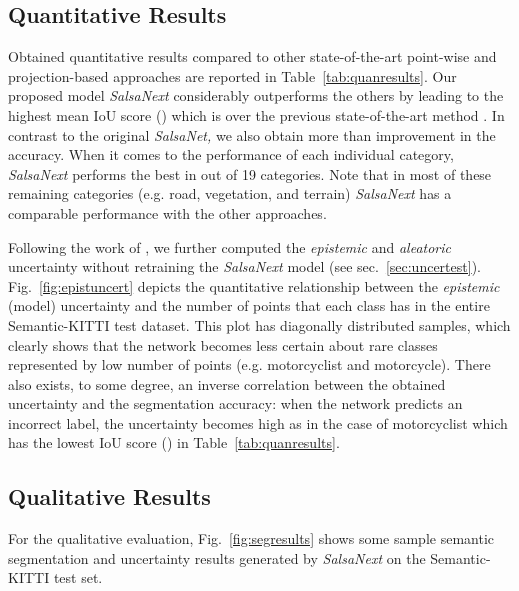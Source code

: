 \documentclass[letterpaper, 10 pt, conference]{ieeeconf}
\makeatletter
\newcommand{\snx}[1]{\textit{SalsaNext }{#1}}
\newcommand{\snk}[1]{\textit{SalsaNet, }{#1}}
\newcommand{\sk}[1]{Semantic-KITTI {#1}}
\def\eg{e.g.\@\xspace}
\makeatother
\begin{document}
\subsection{Quantitative Results}
 
Obtained quantitative results compared to other state-of-the-art point-wise and projection-based approaches are reported in Table~\ref{tab:quanresults}.
Our proposed model \snx considerably outperforms the others by leading to the highest mean IoU score () which is    over the previous state-of-the-art method \cite{SqueezesegV03}. In contrast to the original \snk we also obtain more than  improvement in the accuracy. 
When it comes to the performance of each individual category, \snx performs the best in   out of 19 categories. Note that in most of these remaining  categories (e.g. road, vegetation, and terrain) \snx  has a comparable performance with the other approaches. 




Following the work of \cite{segu2019general}, we further computed the \textit{epistemic} and \textit{aleatoric} uncertainty without retraining the \snx model (see sec.~\ref{sec:uncertest}). 
Fig.~\ref{fig:epistuncert} depicts the quantitative relationship between the \textit{epistemic} (model) uncertainty and the number of points that each class has in the entire \sk test dataset. 
This plot has diagonally distributed samples, which clearly shows that the network becomes less certain about rare classes represented by low number of points (\eg motorcyclist and motorcycle).
There also exists, to some degree, an inverse correlation between the obtained uncertainty and the segmentation accuracy: when the network predicts an incorrect label, the uncertainty    becomes   high as in the case of motorcyclist which has the lowest IoU score () in  Table~\ref{tab:quanresults}. 





  



\subsection{Qualitative Results}

For the qualitative evaluation, Fig.~\ref{fig:segresults} shows some sample semantic segmentation and uncertainty results generated by \snx on the \sk test set.
\end{document}
